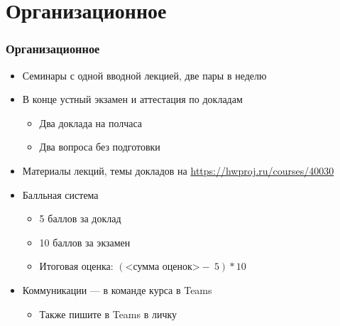 \documentclass{../../slides-style}
\begin{document}
    \begin{frame}[plain]
        \titlepage
    \end{frame}

    \section{Организационное}

    \begin{frame}
        \frametitle{Организационное}
        \begin{itemize}
            \item Семинары с одной вводной лекцией, две пары в неделю
            \item В конце устный экзамен и аттестация по докладам
            \begin{itemize}
                \item Два доклада на полчаса
                \item Два вопроса без подготовки
            \end{itemize}
            \item Материалы лекций, темы докладов на \url{https://hwproj.ru/courses/40030}
            \item Балльная система
            \begin{itemize}
                \item 5 баллов за доклад
                \item 10 баллов за экзамен
                \item Итоговая оценка: $(\textrm{<сумма оценок>} -\ 5) * 10$
            \end{itemize}
            \item Коммуникации --- в команде курса в Teams
            \begin{itemize}
                \item Также пишите в Teams в личку
            \end{itemize}
        \end{itemize}
    \end{frame}
\end{document}
